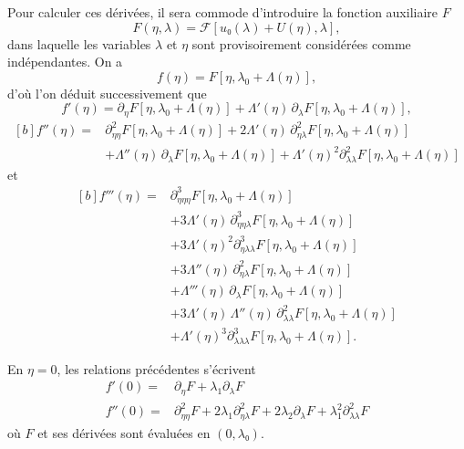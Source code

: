 \documentclass[12pt, final]{amsart}
\begin{document}
Pour calculer ces dérivées, il sera commode d'introduire la fonction auxiliaire
\(F\)
\begin{equation}
  F(\eta, \lambda)=\mathcal F[u₀(\lambda)+U(\eta), \lambda],
\end{equation}
dans laquelle les variables \(\lambda\) et \(\eta\) sont provisoirement
considérées comme indépendantes. On a
\begin{equation}
  f(\eta)=F[\eta, \lambda_0+\Lambda(\eta)],
\end{equation}
d'où l'on déduit successivement que
\begin{equation}
  \label{eq:20211112162417}
  f'(\eta)=\partial_\eta F[\eta, \lambda_0+\Lambda(\eta)]
  +\Lambda'(\eta)\,\partial_\lambda F[\eta, \lambda_0+\Lambda(\eta)],
\end{equation}
\begin{equation}
  \begin{aligned}[b]
    \label{eq:20211112165810}
    f''(\eta)={}&\partial_{\eta\eta}^2F[\eta, \lambda_0+\Lambda(\eta)]
    +2\Lambda'(\eta)\,\partial_{\eta\lambda}^2F[\eta, \lambda_0+\Lambda(\eta)]\\
    &+\Lambda''(\eta)\,\partial_\lambda F[\eta, \lambda_0+\Lambda(\eta)]
    +\Lambda'(\eta)^2\partial_{\lambda\lambda}^2F[\eta, \lambda_0+\Lambda(\eta)]
  \end{aligned}
\end{equation}
et
\begin{equation}
  \label{eq:20211112173223}
  \begin{aligned}[b]
    f'''(\eta)={}&\partial_{\eta\eta\eta}^3F[\eta, \lambda_0+\Lambda(\eta)]\\
    &+3\Lambda'(\eta)\,\partial_{\eta\eta\lambda}^3F[\eta, \lambda_0+\Lambda(\eta)]\\
    &+3\Lambda'(\eta)^2\partial_{\eta\lambda\lambda}^3F[\eta, \lambda_0+\Lambda(\eta)]\\
    &+3\Lambda''(\eta)\,\partial_{\eta\lambda}^2F[\eta, \lambda_0+\Lambda(\eta)]\\
    &+\Lambda'''(\eta)\,\partial_\lambda F[\eta, \lambda_0+\Lambda(\eta)]\\
    &+3\Lambda'(\eta)\,\Lambda''(\eta)\,\partial_{\lambda\lambda}^2F[\eta, \lambda_0+\Lambda(\eta)]\\
    &+\Lambda'(\eta)^3\partial_{\lambda\lambda\lambda}^3F[\eta, \lambda_0+\Lambda(\eta)].
  \end{aligned}
\end{equation}

En \(\eta=0\), les relations précédentes s'écrivent
\begin{align}
  f'(0)={}&\partial_\eta F+\lambda_1\partial_\lambda F\\
  f''(0)={}&\partial_{\eta\eta}^2F+2\lambda_1\partial_{\eta\lambda}^2F
             +2\lambda_2\partial_\lambda F+\lambda_1^2\partial_{\lambda\lambda}^2F
\end{align}
où \(F\) et ses dérivées sont évaluées en \((0, λ₀)\).
\end{document}
